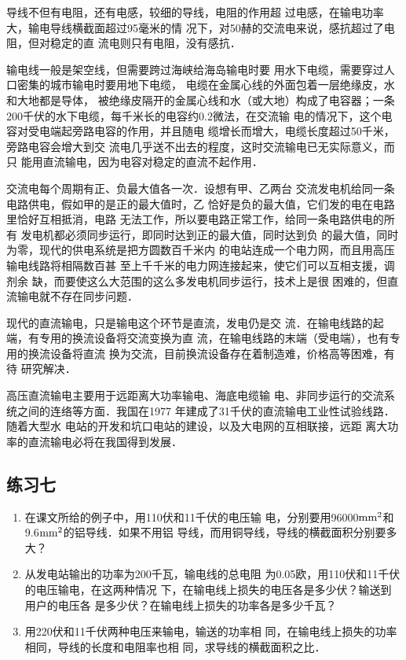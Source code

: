 导线不但有电阻，还有电感，较细的导线，电阻的作用超
过电感，在输电功率大，输电导线横截面超过95毫米的情
况下，对50赫的交流电来说，感抗超过了电阻，但对稳定的直
流电则只有电阻，没有感抗．

输电线一般是架空线，但需要跨过海峡给海岛输电时要
用水下电缆，需要穿过人口密集的城市输电时要用地下电缆，
电缆在金属心线的外面包着一层绝缘皮，水和大地都是导体，
被绝缘皮隔开的金属心线和水（或大地）构成了电容器；一条
200千伏的水下电缆，每千米长的电容约0.2微法，在交流输
电的情况下，这个电容对受电端起旁路电容的作用，并且随电
缆增长而增大，电缆长度超过50千米，旁路电容会增大到交
流电几乎送不出去的程度，这时交流输电已无实际意义，而只
能用直流输电，因为电容对稳定的直流不起作用．

交流电每个周期有正、负最大值各一次．设想有甲、乙两台
交流发电机给同一条电路供电，假如甲的是正的最大值时，乙
恰好是负的最大值，它们发的电在电路里恰好互相抵消，电路
无法工作，所以要电路正常工作，给同一条电路供电的所有
发电机都必须同步运行，即同时达到正的最大值，同时达到负
的最大值，同时为零，现代的供电系统是把方圆数百千米内
的电站连成一个电力网，而且用高压输电线路将相隔数百甚
至上千千米的电力网连接起来，使它们可以互相支援，调剂余
缺，而要使这么大范围的这么多发电机同步运行，技术上是很
困难的，但直流输电就不存在同步问题．

现代的直流输电，只是输电这个环节是直流，发电仍是交
流．在输电线路的起端，有专用的换流设备将交流变换为直
流，在输电线路的末端（受电端），也有专用的换流设备将直流
换为交流，目前换流设备存在着制造难，价格高等困难，有待
研究解决．

高压直流输电主要用于远距离大功率输电、海底电缆输
电、非同步运行的交流系统之间的连络等方面．我国在1977
年建成了31千伏的直流输电工业性试验线路．随着大型水
电站的开发和坑口电站的建设，以及大电网的互相联接，远距
离大功率的直流输电必将在我国得到发展．

\subsection*{练习七}
\begin{enumerate}
    \item 在课文所给的例子中，用110伏和11千伏的电压输
电，分别要用96000${\rm mm}^2$和9.6${\rm mm}^2$的铝导线．如果不用铝
导线，而用铜导线，导线的横截面积分别要多大？
\item 从发电站输出的功率为200千瓦，输电线的总电阻
为0.05欧，用110伏和11千伏的电压输电，在这两种情况
下，在输电线上损失的电压各是多少伏？输送到用户的电压各
是多少伏？在输电线上损失的功率各是多少千瓦？
\item 用220伏和11千伏两种电压来输电，输送的功率相
同，在输电线上损失的功率相同，导线的长度和电阻率也相
同，求导线的横截面积之比．
\end{enumerate}

